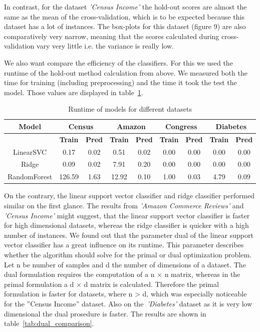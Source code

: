 \documentclass[a4paper,10pt]{article}
\begin{document}
In contrast, for the dataset 
\textit{'Census Income'} the hold-out scores are almost the same as the mean of the cross-validation, which is to be
expected because this dataset has a lot of instances. The box-plots for this dataset (figure 9) are also
comparatively very narrow, meaning that the scores calculated during cross-validation vary very little i.e.
the variance is really low.




We also want compare the efficiency of the classifiers. For this we used the runtime of the hold-out
method calculation from above. We measured both the time for training (including preprocessing) and
the time it took the test the model. Those values are displayed in table~\ref{tab:runtime_models}.


\begin{table}[h!]
\centering
\footnotesize
\begin{tabular}{|c|c|c|c|c|c|c|c|c|}
\hline
\textbf{Model} & \multicolumn{2}{c|}{Census} & \multicolumn{2}{c|}{Amazon} & \multicolumn{2}{c|}{Congress} & \multicolumn{2}{c|}{Diabetes} \\
\hline
& \textbf{Train} & \textbf{Pred} & \textbf{Train} & \textbf{Pred} & \textbf{Train} & \textbf{Pred} & \textbf{Train} & \textbf{Pred} \\
\hline
LinearSVC & 0.17 & 0.02 & 0.51 & 0.02 & 0.00 & 0.00 & 0.00 & 0.00 \\
\hline
Ridge & 0.09 & 0.02 & 7.91 & 0.20 & 0.00 & 0.00 & 0.00 & 0.00 \\
\hline
RandomForest & 126.59 & 1.63 & 12.92 & 0.10 & 1.00 & 0.03 & 4.79 & 0.09 \\
\hline
\end{tabular}
\vspace{0.3cm}
\caption{Runtime of models for different datasets}
\label{tab:runtime_models}
\end{table}




On the contrary, the linear support vector classifier and ridge classifier performed similar
on the first glance. The results from \textit{'Amazon Commerce Reviews'} and \textit{'Census Income'} might suggest,
that the linear support vector classifier is faster for high dimensional datasets, whereas the ridge classifier
is quicker with a high number of instances. We found out that the parameter dual of the linear support
vector classifier has a great influence on its runtime. This parameter describes whether the algorithm
should solve for the primal or dual optimization problem. Let n be number of samples and d the number
of dimensions of a dataset. The dual formulation requires the computation of a n × n matrix, whereas
in the primal formulation a d × d matrix is calculated. Therefore the primal formulation is faster for
datasets, where n > d, which was especially noticeable for the ”Census Income” dataset. Also on the~\textit{'Diabetes'}
dataset as it is very low dimensional the dual prosedure is faster. The results are shown in table~\ref{tab:dual_comparison}.
\end{document}
